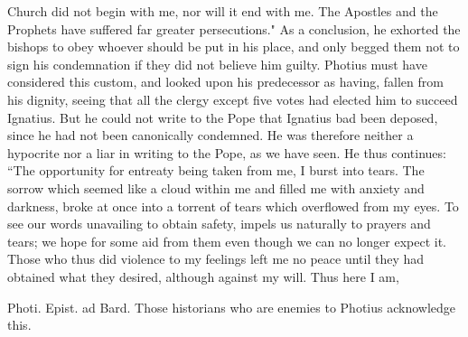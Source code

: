 Church did not begin with me, nor will it end with me. The Apostles and the Prophets have suffered far greater persecutions." As a conclusion, he exhorted the bishops to obey whoever should be put in his place, and only begged them not to sign his condemnation if they did not believe him guilty. Photius must have considered this custom, and looked upon his predecessor as having, fallen from his dignity, seeing that all the clergy except five votes had elected him to succeed Ignatius. But he could not write to the Pope that Ignatius bad been deposed, since he had not been canonically condemned. He was therefore neither a hypocrite nor a liar in writing to the Pope, as we have seen. He thus continues: “The opportunity for entreaty being taken from me, I burst into tears. The sorrow which seemed like a cloud within me and filled me with anxiety and darkness, broke at once into a torrent of tears which overflowed from my eyes. To see our words unavailing to obtain safety, impels us naturally to prayers and tears; we hope for some aid from them even though we can no longer expect it. Those who thus did violence to my feelings left me no peace until they had obtained what they desired, although against my will. Thus here I am,

Photi. Epist. ad Bard. Those historians who are enemies to Photius acknowledge this.

